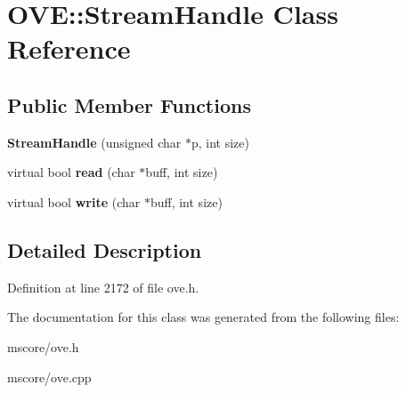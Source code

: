 \hypertarget{class_o_v_e_1_1_stream_handle}{}\section{O\+VE\+:\+:Stream\+Handle Class Reference}
\label{class_o_v_e_1_1_stream_handle}
\subsection*{Public Member Functions}
\begin{DoxyCompactItemize}
\item 
\mbox{\label{class_o_v_e_1_1_stream_handle_a7fbbe06f46d9ebf8e68ba1cab65de315}} 
{\bfseries Stream\+Handle} (unsigned char $\ast$p, int size)
\item 
\mbox{\label{class_o_v_e_1_1_stream_handle_a019b62c2e25770dd2f00a9aaa01feba5}} 
virtual bool {\bfseries read} (char $\ast$buff, int size)
\item 
\mbox{\label{class_o_v_e_1_1_stream_handle_abcb6306d344f9e4ddd327aac22376ab7}} 
virtual bool {\bfseries write} (char $\ast$buff, int size)
\end{DoxyCompactItemize}


\subsection{Detailed Description}


Definition at line 2172 of file ove.\+h.



The documentation for this class was generated from the following files\+:\begin{DoxyCompactItemize}
\item 
mscore/ove.\+h\item 
mscore/ove.\+cpp\end{DoxyCompactItemize}
